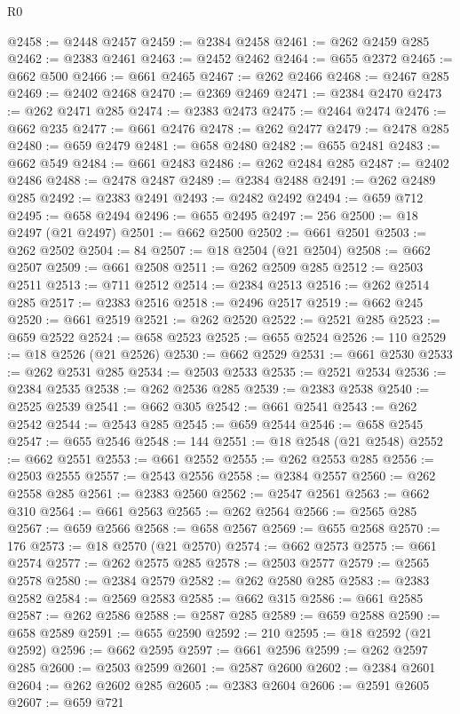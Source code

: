 \begin{lexlean}{R0}
\begin{coremodule}
@2458 := @2448 @2457
@2459 := @2384 @2458
@2461 := @262 @2459 @285
@2462 := @2383 @2461
@2463 := @2452 @2462
@2464 := @655 @2372
@2465 := @662 @500
@2466 := @661 @2465
@2467 := @262 @2466
@2468 := @2467 @285
@2469 := @2402 @2468
@2470 := @2369 @2469
@2471 := @2384 @2470
@2473 := @262 @2471 @285
@2474 := @2383 @2473
@2475 := @2464 @2474
@2476 := @662 @235
@2477 := @661 @2476
@2478 := @262 @2477
@2479 := @2478 @285
@2480 := @659 @2479
@2481 := @658 @2480
@2482 := @655 @2481
@2483 := @662 @549
@2484 := @661 @2483
@2486 := @262 @2484 @285
@2487 := @2402 @2486
@2488 := @2478 @2487
@2489 := @2384 @2488
@2491 := @262 @2489 @285
@2492 := @2383 @2491
@2493 := @2482 @2492
@2494 := @659 @712
@2495 := @658 @2494
@2496 := @655 @2495
@2497 := 256
@2500 := @18 @2497 (@21 @2497)
@2501 := @662 @2500
@2502 := @661 @2501
@2503 := @262 @2502
@2504 := 84
@2507 := @18 @2504 (@21 @2504)
@2508 := @662 @2507
@2509 := @661 @2508
@2511 := @262 @2509 @285
@2512 := @2503 @2511
@2513 := @711 @2512
@2514 := @2384 @2513
@2516 := @262 @2514 @285
@2517 := @2383 @2516
@2518 := @2496 @2517
@2519 := @662 @245
@2520 := @661 @2519
@2521 := @262 @2520
@2522 := @2521 @285
@2523 := @659 @2522
@2524 := @658 @2523
@2525 := @655 @2524
@2526 := 110
@2529 := @18 @2526 (@21 @2526)
@2530 := @662 @2529
@2531 := @661 @2530
@2533 := @262 @2531 @285
@2534 := @2503 @2533
@2535 := @2521 @2534
@2536 := @2384 @2535
@2538 := @262 @2536 @285
@2539 := @2383 @2538
@2540 := @2525 @2539
@2541 := @662 @305
@2542 := @661 @2541
@2543 := @262 @2542
@2544 := @2543 @285
@2545 := @659 @2544
@2546 := @658 @2545
@2547 := @655 @2546
@2548 := 144
@2551 := @18 @2548 (@21 @2548)
@2552 := @662 @2551
@2553 := @661 @2552
@2555 := @262 @2553 @285
@2556 := @2503 @2555
@2557 := @2543 @2556
@2558 := @2384 @2557
@2560 := @262 @2558 @285
@2561 := @2383 @2560
@2562 := @2547 @2561
@2563 := @662 @310
@2564 := @661 @2563
@2565 := @262 @2564
@2566 := @2565 @285
@2567 := @659 @2566
@2568 := @658 @2567
@2569 := @655 @2568
@2570 := 176
@2573 := @18 @2570 (@21 @2570)
@2574 := @662 @2573
@2575 := @661 @2574
@2577 := @262 @2575 @285
@2578 := @2503 @2577
@2579 := @2565 @2578
@2580 := @2384 @2579
@2582 := @262 @2580 @285
@2583 := @2383 @2582
@2584 := @2569 @2583
@2585 := @662 @315
@2586 := @661 @2585
@2587 := @262 @2586
@2588 := @2587 @285
@2589 := @659 @2588
@2590 := @658 @2589
@2591 := @655 @2590
@2592 := 210
@2595 := @18 @2592 (@21 @2592)
@2596 := @662 @2595
@2597 := @661 @2596
@2599 := @262 @2597 @285
@2600 := @2503 @2599
@2601 := @2587 @2600
@2602 := @2384 @2601
@2604 := @262 @2602 @285
@2605 := @2383 @2604
@2606 := @2591 @2605
@2607 := @659 @721

\end{coremodule}
\end{lexlean}
